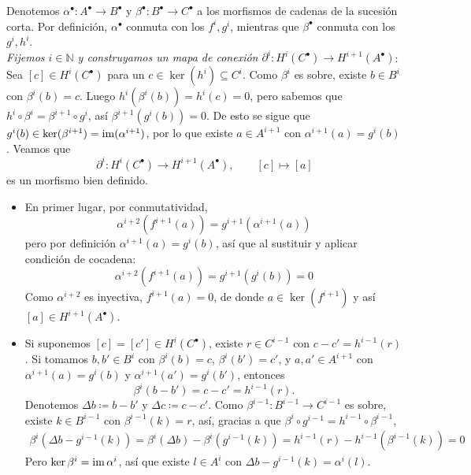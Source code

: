 \begin{sol}
Denotemos $\alpha^{\bullet}\colon A^{\bullet} \to B^{\bullet}$ y $\beta^{\bullet}\colon B^{\bullet} \to C^{\bullet}$ a los morfismos de cadenas de la sucesión corta. Por definición, $\alpha^{\bullet}$ conmuta con los $f^i,g^i$, mientras que $\beta^{\bullet}$ conmuta con los $g^i,h^i$.
\vspace{1em}\\
\emph{Fijemos $i\in\mathbb{N}$ y construyamos un mapa de conexión $\partial^i\colon H^i(C^{\bullet})\to H^{i+1}(A^{\bullet})$}:\\ 
Sea $[c]\in H^i(C^{\bullet})$ para un $c\in\ker(h^i)\subseteq C^i$. Como $\beta^i$ es sobre, existe $b\in B^i$ con $\beta^i(b)=c$. Luego $h^i(\beta^i(b))=h^i(c)=0$, pero sabemos que $h^i\circ\beta^i=\beta^{i+1}\circ g^i$, así $\beta^{i+1}(g^i(b))=0$. De esto se sigue que $g^i(b)\in\ker(\beta^{i+1})=\operatorname{im}(\alpha^{i+1})$, por lo que existe $a\in A^{i+1}$ con $\alpha^{i+1}(a)=g^i(b)$. Veamos que
\[
\partial^i\colon H^i(C^{\bullet})\longrightarrow H^{i+1}(A^{\bullet}),
\qquad [c]\longmapsto[a]
\]
es un morfismo bien definido.
\begin{itemize}
    \item En primer lugar, por conmutatividad,
    \[
    \alpha^{i+2}(f^{i+1}(a))=g^{i+1}(\alpha^{i+1}(a))
    \]
    pero por definición $\alpha^{i+1}(a)=g^i(b)$, así que al sustituir y aplicar condición de cocadena:
    \[
    \alpha^{i+2}(f^{i+1}(a))=g^{i+1}(g^i(b)) = 0
    \]
    Como $\alpha^{i+2}$ es inyectiva, $f^{i+1}(a)=0$, de donde $a\in\ker(f^{i+1})$ y así $[a]\in H^{i+1}(A^{\bullet})$.

    \item Si suponemos $[c]=[c']\in H^i(C^{\bullet})$, existe $r\in C^{i-1}$ con $c-c'=h^{i-1}(r)$. 
    Si tomamos $b,b'\in B^i$ con $\beta^i(b)=c$, $\beta^i(b')=c'$, y $a,a'\in A^{i+1}$ con $\alpha^{i+1}(a)=g^i(b)$ y $\alpha^{i+1}(a')=g^i(b')$, entonces
    \[
    \beta^i(b-b')=c-c'=h^{i-1}(r).
    \]
    Denotemos $\Delta b\coloneq b-b'$ y $\Delta c\coloneq c-c'$. Como $\beta^{i-1}\colon B^{i-1}\to C^{i-1}$ es sobre, existe $k\in B^{i-1}$ con $\beta^{i-1}(k)=r$, así, gracias a que $\beta^i\circ g^{i-1}=h^{i-1}\circ\beta^{i-1}$,
    \begin{align*}
    \beta^i(\Delta b-g^{i-1}(k))
    =\beta^i(\Delta b)-\beta^i(g^{i-1}(k))
    =h^{i-1}(r)-h^{i-1}(\beta^{i-1}(k))=0
    \end{align*}
    Pero $\ker\beta^i=\operatorname{im}\alpha^i$, así que existe $l\in A^i$ con $\Delta b-g^{i-1}(k) =\alpha^i(l)$.


\end{itemize}
\end{sol}
